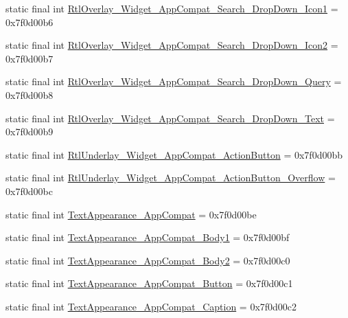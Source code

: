 \begin{DoxyCompactItemize}
\item 
static final int \mbox{\hyperlink{classandroid_1_1support_1_1design_1_1_r_1_1style_ade60ca91c16982eaf6b75694ed4f86c2}{Rtl\+Overlay\+\_\+\+Widget\+\_\+\+App\+Compat\+\_\+\+Search\+\_\+\+Drop\+Down\+\_\+\+Icon1}} = 0x7f0d00b6
\item 
static final int \mbox{\hyperlink{classandroid_1_1support_1_1design_1_1_r_1_1style_a33f59a8fbfa51417eb810c8f3ea703d3}{Rtl\+Overlay\+\_\+\+Widget\+\_\+\+App\+Compat\+\_\+\+Search\+\_\+\+Drop\+Down\+\_\+\+Icon2}} = 0x7f0d00b7
\item 
static final int \mbox{\hyperlink{classandroid_1_1support_1_1design_1_1_r_1_1style_af5d79a9f7bda95a6bb733e4e50aeae28}{Rtl\+Overlay\+\_\+\+Widget\+\_\+\+App\+Compat\+\_\+\+Search\+\_\+\+Drop\+Down\+\_\+\+Query}} = 0x7f0d00b8
\item 
static final int \mbox{\hyperlink{classandroid_1_1support_1_1design_1_1_r_1_1style_a09f6359f265a6b5412de4226637340cb}{Rtl\+Overlay\+\_\+\+Widget\+\_\+\+App\+Compat\+\_\+\+Search\+\_\+\+Drop\+Down\+\_\+\+Text}} = 0x7f0d00b9
\item 
static final int \mbox{\hyperlink{classandroid_1_1support_1_1design_1_1_r_1_1style_af006a927e9fcf9187ad094601c2fd979}{Rtl\+Underlay\+\_\+\+Widget\+\_\+\+App\+Compat\+\_\+\+Action\+Button}} = 0x7f0d00bb
\item 
static final int \mbox{\hyperlink{classandroid_1_1support_1_1design_1_1_r_1_1style_aaa94611b0f8dda49a6a2a8ad7ecb9b97}{Rtl\+Underlay\+\_\+\+Widget\+\_\+\+App\+Compat\+\_\+\+Action\+Button\+\_\+\+Overflow}} = 0x7f0d00bc
\item 
static final int \mbox{\hyperlink{classandroid_1_1support_1_1design_1_1_r_1_1style_a150f94913f3a6732ce3ba8a8afdd1e3a}{Text\+Appearance\+\_\+\+App\+Compat}} = 0x7f0d00be
\item 
static final int \mbox{\hyperlink{classandroid_1_1support_1_1design_1_1_r_1_1style_a8ed35c1c1c7ff1e4555efdd939993b32}{Text\+Appearance\+\_\+\+App\+Compat\+\_\+\+Body1}} = 0x7f0d00bf
\item 
static final int \mbox{\hyperlink{classandroid_1_1support_1_1design_1_1_r_1_1style_a984f35eb8517130ee3bb9c77f4db3d6b}{Text\+Appearance\+\_\+\+App\+Compat\+\_\+\+Body2}} = 0x7f0d00c0
\item 
static final int \mbox{\hyperlink{classandroid_1_1support_1_1design_1_1_r_1_1style_abb6ae1be3e2e1bd68fd51e2d090dbb82}{Text\+Appearance\+\_\+\+App\+Compat\+\_\+\+Button}} = 0x7f0d00c1
\item 
static final int \mbox{\hyperlink{classandroid_1_1support_1_1design_1_1_r_1_1style_a7beee5ea7f39ff6f540899b876335d06}{Text\+Appearance\+\_\+\+App\+Compat\+\_\+\+Caption}} = 0x7f0d00c2

\end{DoxyCompactItemize}
